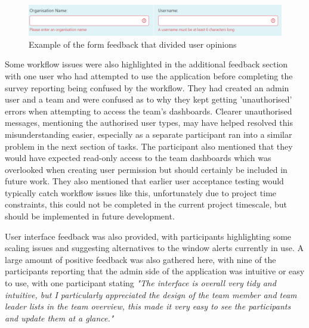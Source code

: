 \documentclass[l4proj.tex]{subfiles}
\begin{document}
\begin{figure}[h!]
\begin{center}
\includegraphics[scale=0.57]{dissertation/images/EvaluationExampleOfFormFeedback.png}
\caption{Example of the form feedback that divided user opinions}
\label{fig:admin form feedback} 
\end{center}
\end{figure}

Some workflow issues were also highlighted in the additional feedback section with one user who had attempted to use the application before completing the survey reporting being confused by the workflow. They had created an admin user and a team and were confused as to why they kept getting 'unauthorised' errors when attempting to access the team's dashboards. Clearer unauthorised messages, mentioning the authorised user types, may have helped resolved this misunderstanding easier, especially as a separate participant ran into a similar problem in the next section of tasks. The participant also mentioned that they would have expected read-only access to the team dashboards which was overlooked when creating user permission but should certainly be included in future work. They also mentioned that earlier user acceptance testing would typically catch workflow issues like this, unfortunately due to project time constraints, this could not be completed in the current project timescale, but should be implemented in future development.

User interface feedback was also provided, with participants highlighting some scaling issues and suggesting alternatives to the window alerts currently in use. A large amount of positive feedback was also gathered here, with nine of the participants reporting that the admin side of the application was intuitive or easy to use, with one participant stating \textit{"The interface is overall very tidy and intuitive, but I particularly appreciated the design of the team member and team leader lists in the team overview, this made it very easy to see the participants and update them at a glance."}
\end{document}
